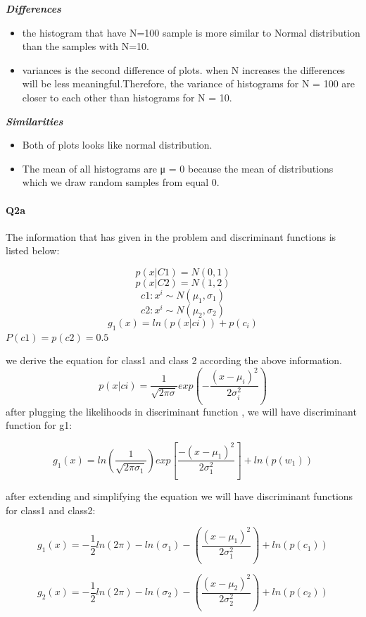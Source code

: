 \documentclass[12pt]{article}
\begin{document}
	\textit{\textbf{Differences}}
\begin{itemize}
	\item the histogram that have N=100 sample is more similar to Normal distribution than the samples with N=10.
	\item  variances is the second difference of plots. when N increases the differences will be less meaningful.Therefore, the variance of histograms for N = 100 are closer to each other than histograms for N = 10.
\\

	
\end{itemize}
	
		\textit{\textbf{Similarities}}
		\begin{itemize}
			\item Both of plots looks like normal distribution.
			\item The mean of all histograms are μ = 0 because the mean of distributions which we
			draw random samples from equal 0.
		
		\end{itemize}
		\paragraph{Q2a}	The information that has given in the problem and discriminant functions is listed below:	
				
	$$	p(x|C1) = N(0,1)$$ $$p(x|C2) = N(1,2)$$
	$$c1:x^{i}\sim N(\mu_{1},\sigma_{1})$$ 
		$$c2:x^{i}\sim N(\mu_{2},\sigma_{2})$$	
		$$g_{1}(x)=ln(p(x|c{i}))+p(c_{i})$$
		$P(c1)=p(c2)=0.5$

			we derive the equation for class1 and class 2 according the above information.
			$$p(x|c{i})=\frac{1}{\sqrt{2\pi\sigma}}exp(-\frac{(x-{\mu_{i}})^{2}}{2\sigma_{i}^{2}})$$
			after plugging the likelihoods in discriminant function , we will have discriminant function for g1:

		$$g_{1}(x)=ln(\frac{1}{\sqrt{2\pi\sigma_{1}}})exp[\frac{-(x-\mu_{1})^{2}}{2\sigma_{1}^{2}}]+ln(p(w_{1}))$$
		
		after extending and simplifying the equation we will have discriminant functions for class1 and class2:


		
		$$g_{1}(x)=-\frac{1}{2}ln(2\pi)-ln(\sigma_{1})-(\frac{(x-\mu_{1})^{2}}{2\sigma_{1}^{2}})+ln(p(c_{1}))$$
		
		$$g_{2}(x)=-\frac{1}{2}ln(2\pi)-ln(\sigma_{2})-(\frac{(x-\mu_{2})^{2}}{2\sigma_{2}^{2}})+ln(p(c_{2}))$$
	
\end{document}
